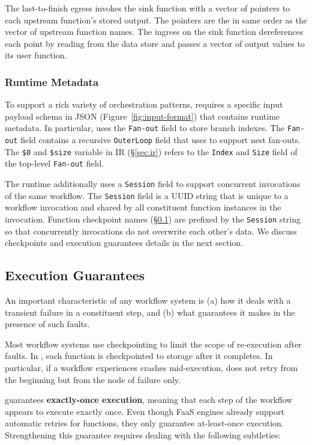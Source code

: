 The last-to-finish egress invokes the sink function with a vector of pointers
to each upstream function's stored output. The pointers are the in same order
as the vector of upstream function names. The ingress on the sink function
dereferences each point by reading from the data store and passes a vector of
output values to its user function.


\subsubsection{Runtime Metadata}

To support a rich variety of orchestration patterns, \name{} requires a
specific input payload schema in JSON (Figure~\ref{fig:input-format}) that
contains \name{} runtime metadata. In particular, \name{} uses the
\texttt{Fan-out} field to store branch indexes. The \texttt{Fan-out} field
contains a recursive \texttt{OuterLoop} field that \name{} uses to support
nest fan-outs. The \texttt{\$0} and \texttt{\$size} variable in
\name{} IR (\S\ref{sec:ir}) refers to the \texttt{Index}  and \texttt{Size}
field of the top-level \texttt{Fan-out} field.

The runtime additionally uses a \texttt{Session} field to support concurrent
invocations of the same workflow. The \texttt{Session} field is a UUID string
that is unique to a workflow invocation and shared by all constituent function
instances in the invocation. Function checkpoint names
(\S\ref{sec:exec-gntee}) are prefixed by the \texttt{Session} string so that
concurrently invocations do not overwrite each other's data. We discuss
\name{} checkpoints and execution guarantees details in the next section.


\subsection{Execution Guarantees}\label{sec:exec-gntee}

An important characteristic of any workflow system is (a) how it deals with  a
transient failure in a constituent step, and (b) what guarantees it makes in
the presence of such faults.
 
Most workflow systems use checkpointing to limit the scope of re-execution
after faults. In \name{}, each function is checkpointed to storage after it
completes. In particular, if a workflow experiences crashes mid-execution,
\name{} does not retry from the beginning but from the node of failure only.

\name{} guarantees \textbf{exactly-once execution}, meaning that each step of
the workflow appears to execute exactly once. Even though FaaS engines already
support automatic retries for functions, they only guarantee at-least-once
execution. Strengthening this guarantee requires dealing with the following
subtleties:

